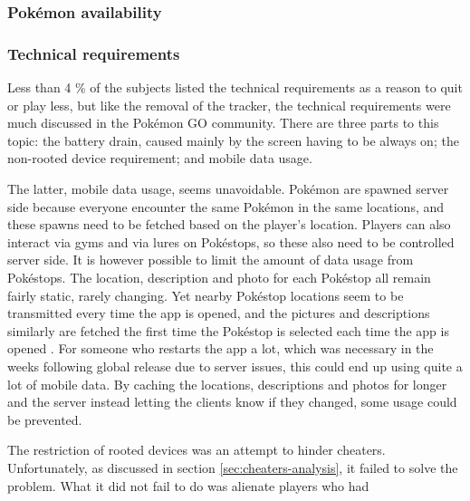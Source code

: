 \subsubsection{Pokémon availability}


\subsubsection{Technical requirements}
Less than 4 \% of the subjects listed the technical requirements as a reason to quit or play less, but like the removal of the tracker, the technical requirements were much discussed in the Pokémon GO community. There are three parts to this topic: the battery drain, caused mainly by the screen having to be always on; the non-rooted device requirement; and mobile data usage.

The latter, mobile data usage, seems unavoidable. Pokémon are spawned server side because everyone encounter the same Pokémon in the same locations, and these spawns need to be fetched based on the player's location. Players can also interact via gyms and via lures on Pokéstops, so these also need to be controlled server side. It is however possible to limit the amount of data usage from Pokéstops. The location, description and photo for each Pokéstop all remain fairly static, rarely changing. Yet nearby Pokéstop locations seem to be transmitted every time the app is opened, and the pictures and descriptions similarly are fetched the first time the Pokéstop is selected each time the app is opened . For someone who restarts the app a lot, which was necessary in the weeks following global release due to server issues, this could end up using quite a lot of mobile data. By caching the locations, descriptions and photos for longer and the server instead letting the clients know if they changed, some usage could be prevented.

The restriction of rooted devices was an attempt to hinder cheaters. Unfortunately, as discussed in section \ref{sec:cheaters-analysis}, it failed to solve the problem. What it did not fail to do was alienate players who had 

